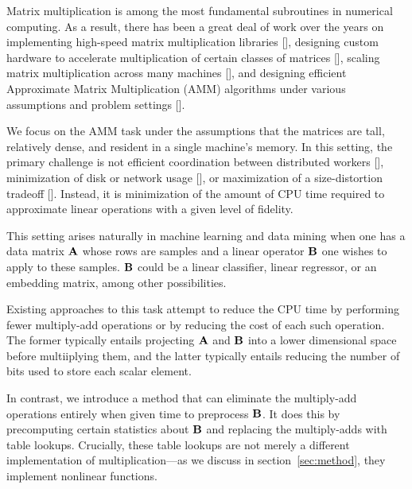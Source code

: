 
Matrix multiplication is among the most fundamental subroutines in numerical computing. As a result, there has been a great deal of work over the years on implementing high-speed matrix multiplication libraries [], designing custom hardware to accelerate multiplication of certain classes of matrices [], scaling matrix multiplication across many machines [], and designing efficient Approximate Matrix Multiplication (AMM) algorithms under various assumptions and problem settings [].

We focus on the AMM task under the assumptions that the matrices are tall, relatively dense, and resident in a single machine's memory. In this setting, the primary challenge is not efficient coordination between distributed workers [], minimization of disk or network usage [], or maximization of a size-distortion tradeoff []. Instead, it is minimization of the amount of CPU time required to approximate linear operations with a given level of fidelity.

This setting arises naturally in machine learning and data mining when one has a data matrix $\mathbf{A}$ whose rows are samples and a linear operator $\mathbf{B}$ one wishes to apply to these samples. $\mathbf{B}$ could be a linear classifier, linear regressor, or an embedding matrix, among other possibilities.

Existing approaches to this task attempt to reduce the CPU time by performing fewer multiply-add operations or by reducing the cost of each such operation. The former typically entails projecting $\mathbf{A}$ and $\mathbf{B}$ into a lower dimensional space before multiiplying them, and the latter typically entails reducing the number of bits used to store each scalar element.

In contrast, we introduce a method that can eliminate the multiply-add operations entirely when given time to preprocess $\mathbf{B}$. It does this by precomputing certain statistics about $\mathbf{B}$ and replacing the multiply-adds with table lookups. Crucially, these table lookups are not merely a different implementation of multiplication---as we discuss in section~\ref{sec:method}, they implement nonlinear functions. %

